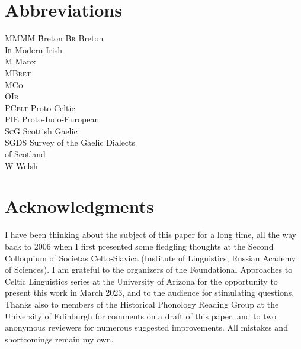 \documentclass[output=paper,colorlinks,citecolor=brown]{langscibook}
\begin{document}
\section*{Abbreviations}
\begin{multicols}{2}
\begin{tabbing}
MMMM \= Breton\kill
\textsc{Br} \> Breton\\
\textsc{Ir} \> Modern Irish\\
M \> Manx\\
\textsc{MBret} \> \\
\textsc{MCo} \> \\
\textsc{OIr} \> \\
 \textsc{PCelt} \> Proto-Celtic\\
PIE \> Proto-Indo-European\\
\textsc{ScG} \> Scottish Gaelic\\
SGDS \> Survey of the Gaelic Dialects \\ \> of Scotland\\
W \> Welsh
\end{tabbing}
\end{multicols}




\section*{Acknowledgments}

I have been thinking about the subject of this paper for a long time, all the way back to 2006 when I first presented some fledgling thoughts at the Second Colloquium of Societas Celto-Slavica (Institute of Linguistics, Russian Academy of Sciences). I am grateful to the organizers of the Foundational Approaches to Celtic Linguistics series at the University of Arizona for the opportunity to present this work in March 2023, and to the audience for stimulating questions. Thanks also to members of the Historical Phonology Reading Group at the University of Edinburgh for comments on a draft of this paper, and to two anonymous reviewers for numerous suggested improvements. All mistakes and shortcomings remain my own.


\printbibliography[heading=subbibliography,notkeyword=this]
\end{document}
